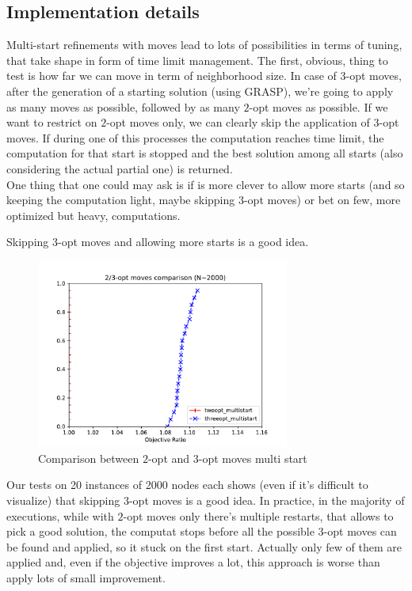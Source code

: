 \subsection{Implementation details}
Multi-start refinements with moves lead to lots of possibilities in terms of
tuning, that take shape in form of time limit management. The first, obvious,
thing to test is how far we can move in term of neighborhood size. In case of
$3$-opt moves, after the generation of a starting solution (using GRASP), we're
going to apply as many moves as possible, followed by as many $2$-opt moves as
possible. If we want to restrict on $2$-opt moves only, we can clearly skip the
application of $3$-opt moves. If during one of this processes the computation
reaches time limit, the computation for that start is stopped and the best
solution among all starts (also considering the actual partial one) is
returned.\\ One thing that one could may ask is if is more clever to allow more
starts (and so keeping the computation light, maybe skipping $3$-opt moves) or
bet on few, more optimized but heavy, computations.

\begin{claim}
    Skipping $3$-opt moves and allowing more starts is a good idea.
\end{claim}

\begin{figure}[h!]
    \centering
    \includegraphics[width=0.74\textwidth]{figures/twothree}
    \caption{Comparison between $2$-opt and $3$-opt moves multi start}
\end{figure}

Our tests on 20 instances of 2000 nodes each shows (even if it's difficult to
visualize) that skipping $3$-opt moves is a good idea. In practice, in the
majority of executions, while with $2$-opt moves only there's multiple restarts,
that allows to pick a good solution, the computat stops before all the
possible $3$-opt moves can be found and applied, so it stuck on the first start.
Actually only few of them are applied and, even if the objective improves a lot,
this approach is worse than apply lots of small improvement.\\

